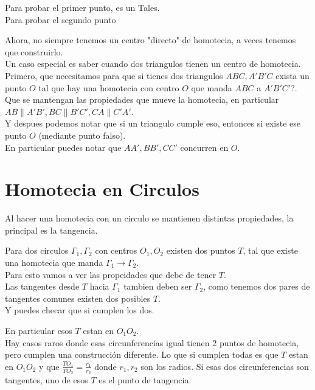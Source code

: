 \documentclass[11pt]{scrartcl}
\begin{document}
Para probar el primer punto, es un Tales. \\

Para probar el segundo punto 




Ahora, no siempre tenemos un centro "directo" de homotecia, a veces tenemos que construirlo. \\

Un caso especial es saber cuando dos triangulos tienen un centro de homotecia. \\

Primero, que necesitamos para que si tienes dos triangulos $ABC, A'B'C$ exista un punto $O$ tal que hay una homotecia con centro $O$ que manda $ABC$ a $A'B'C'$?. \\
Que se mantengan las propiedades que mueve la homotecia, en particular $AB \parallel A'B', BC \parallel B'C',CA \parallel C'A'$.\\
Y despues podemos notar que si un triangulo cumple eso, entonces si existe ese punto $O$ (mediante punto falso). \\

En particular puedes notar que $AA', BB', CC'$ concurren en $O$. \\


\section{Homotecia en Circulos}

Al hacer una homotecia con un circulo se mantienen distintas propiedades, la principal es la tangencia.


Para dos circulos $\Gamma_1, \Gamma_2$ con centros $O_1, O_2$ existen dos puntos $T$, tal que existe una homotecia que manda 
$\Gamma_1 \to \Gamma_2$. \\

Para esto vamos a ver las propeidades que debe de tener $T$. \\
Las tangentes desde $T$ hacia $\Gamma_1$ tambien deben ser $\Gamma_2$, como tenemos dos pares de tangentes comunes existen dos posibles $T$. \\
Y puedes checar que si cumplen los dos. 

En particular esos $T$ estan en $O_1O_2$. \\
 
Hay casos raros donde esas circunferencias igual tienen 2 puntos de homotecia, pero cumplen una construcción diferente. Lo que si cumplen todas es que $T$ estan  en $O_1O_2$ y que $\frac{TO_1}{TO_2}=\frac{r_1}{r_2}$ donde $r_1,r_2$ son los radios.
Si esas dos circunferencias son tangentes, uno de esos $T$ es el punto de tangencia.
\end{document}
